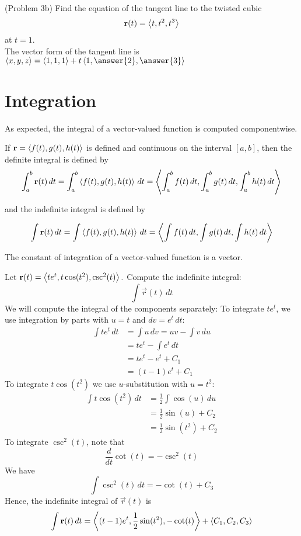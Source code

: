 \documentclass[handout]{ximera}
\begin{document}
\begin{problem}(Problem 3b)
Find the equation of the tangent line to the twisted cubic
\[
\mathbf r(t) = \left\langle t, t^2, t^3\right\rangle
\]
at $t = 1$.\\
The vector form of the tangent line is $\vector{x, y, z} = \vector{1,1,1} + t\vector{1, \answer{2}, \answer{3}}$\\
\end{problem}

\section{Integration}

As expected, the integral of a vector-valued function is computed componentwise.

\begin{definition}
If $\mathbf r = \left\langle f(t), g(t), h(t)\right\rangle$ is defined and continuous on the interval $[a, b]$, then the definite integral is defined by
\[
\int_a^b \mathbf r(t) \, dt = \int_a^b \left\langle f(t), g(t), h(t)\right\rangle \, dt =  \left\langle \int_a^b f(t) \, dt,\int_a^b  g(t) \, dt,\int_a^b  h(t) \, dt\right\rangle
\]

and the indefinite integral is defined by

\[
\int \mathbf r(t) \, dt = \int\left\langle f(t), g(t), h(t)\right\rangle \, dt =  \left\langle \int f(t) \, dt,\int  g(t) \, dt,\int  h(t) \, dt\right\rangle
\]
\end{definition}

\begin{remark}
The constant of integration of a vector-valued function is a vector.
\end{remark}

\begin{example}[Example 4]
Let $\mathbf r(t) = \left\langle te^t,t\cos(t^2),\csc^2(t)\right\rangle.$ Compute the indefinite integral:
\[
\int \vec r(t) \, dt
\]
We will compute the integral of the components separately:
To integrate $te^t$, we use integration by parts with $u = t$ and $dv = e^t \, dt$:
\begin{align*}
\int te^t \, dt &= \int u \, dv = uv - \int v \, du\\
                 &= te^t - \int e^t \, dt\\
                 & = te^t - e^t + C_1\\
                 & = (t-1)e^t + C_1
\end{align*}
To integrate $t\cos(t^2)$ we use $u$-substitution with $ u = t^2$:
\begin{align*}
\int t\cos(t^2) \, dt &= \frac12 \int \cos(u) \, du \\
                 &= \frac12 \sin(u) + C_2\\
                 & = \frac12 \sin(t^2) + C_2
\end{align*}
To integrate $\csc^2(t)$, note that
\[
\frac{d}{dt} \cot(t) = -\csc^2(t)
\]
We have
\[
\int \csc^2(t) \, dt = -\cot(t) + C_3
\]
Hence, the indefinite integral of $\vec r(t)$ is
\[
\int \mathbf r(t) \, dt = \left\langle (t-1)e^t,\frac12 \sin(t^2),-\cot(t)\right\rangle + \left\langle C_1, C_2, C_3\right\rangle
\]

\end{example}
\end{document}

